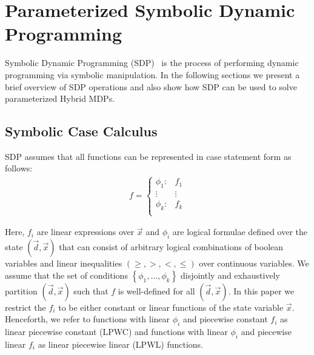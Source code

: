 \section{Parameterized Symbolic Dynamic Programming}
\label{sec:sdp}

Symbolic Dynamic Programming (SDP)~\parencite{Boutilier_IJCAI_2001} is the process of performing dynamic programming via symbolic manipulation. In the following sections we present a brief overview of SDP operations and also show how SDP can be used to solve parameterized Hybrid MDPs.

\subsection{Symbolic Case Calculus}

SDP assumes that all functions can be represented in case statement form \parencite{Boutilier_IJCAI_2001} as follows:
{\footnotesize 
    \abovedisplayskip=5pt
    \belowdisplayskip=0pt
    \begin{align*}
        f = 
        \begin{cases}
            \phi_1: & f_1 \\ 
            \vdots & \vdots\\ 
            \phi_k: & f_k \\ 
        \end{cases}
    \end{align*}
}%

Here, {\footnotesize$ f_i $} are linear expressions over {\footnotesize$ \vec{x} $} and {\footnotesize$\phi_i$} are logical formulae defined over the state {\footnotesize$( \vec{d}, \vec{x})$} that can consist of arbitrary logical combinations of boolean variables and linear inequalities {\footnotesize$\left( \geq, >, <, \leq \right)$} over continuous variables. We assume that the set of conditions {\footnotesize$\left\lbrace \phi_1, \ldots, \phi_k \right\rbrace$} disjointly and exhaustively partition {\footnotesize$(\vec{d}, \vec{x})$} such that {\footnotesize$f$} is well-defined for all {\footnotesize$(\vec{d}, \vec{x})$}. In this paper we restrict the {\footnotesize$f_i$} to be either constant or linear functions of the state variable {\footnotesize$\vec{x}$}. Henceforth, we refer to functions with linear {\footnotesize$\phi_i$} and piecewise constant {\footnotesize$f_i$} as linear piecewise constant (LPWC) and functions with linear {\footnotesize$\phi_i$} and piecewise linear {\footnotesize$f_i$} as linear piecewise linear (LPWL) functions.

